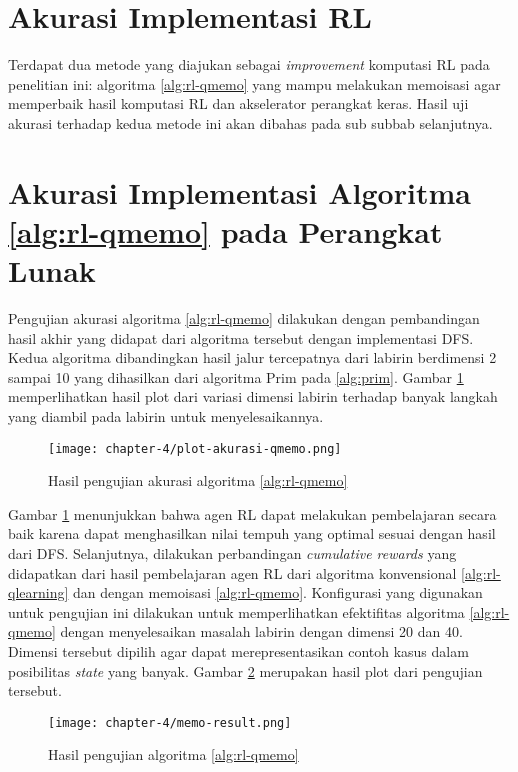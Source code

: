 \section{Akurasi Implementasi \acl{RL}}

Terdapat dua metode yang diajukan sebagai \textit{improvement} komputasi \ac{RL} pada penelitian ini: algoritma \ref{alg:rl-qmemo} yang mampu melakukan memoisasi agar memperbaik hasil komputasi \ac{RL} dan akselerator perangkat keras. Hasil uji akurasi terhadap kedua metode ini akan dibahas pada sub subbab selanjutnya.


\section{Akurasi Implementasi Algoritma \ref{alg:rl-qmemo} pada Perangkat Lunak}

Pengujian akurasi algoritma \ref{alg:rl-qmemo} dilakukan dengan pembandingan hasil akhir yang didapat dari algoritma tersebut dengan implementasi \ac{DFS}. Kedua algoritma dibandingkan hasil jalur tercepatnya dari labirin berdimensi 2 sampai 10 yang dihasilkan dari algoritma Prim pada \ref{alg:prim}. Gambar \ref{fig:akurasi-qmemo} memperlihatkan hasil plot dari variasi dimensi labirin terhadap banyak langkah yang diambil pada labirin untuk menyelesaikannya.

\begin{figure}[h]
	\centering
	\texttt{[image: chapter-4/plot-akurasi-qmemo.png]}
	\caption{Hasil pengujian akurasi algoritma \ref{alg:rl-qmemo}}
	\label{fig:akurasi-qmemo}
\end{figure}

Gambar \ref{fig:akurasi-qmemo} menunjukkan bahwa agen \ac{RL} dapat melakukan pembelajaran secara baik karena dapat menghasilkan nilai tempuh yang optimal sesuai dengan hasil dari \ac{DFS}. Selanjutnya, dilakukan perbandingan \textit{cumulative rewards} yang didapatkan dari hasil pembelajaran agen \ac{RL} dari algoritma konvensional \ref{alg:rl-qlearning} dan dengan memoisasi \ref{alg:rl-qmemo}. Konfigurasi yang digunakan untuk pengujian ini dilakukan untuk memperlihatkan efektifitas algoritma \ref{alg:rl-qmemo} dengan menyelesaikan masalah labirin dengan dimensi 20 dan 40. Dimensi tersebut dipilih agar dapat merepresentasikan contoh kasus dalam posibilitas \textit{state} yang banyak. Gambar \ref{fig:memo-result} merupakan hasil plot dari pengujian tersebut.

\begin{figure}[h]
	\centering
	\texttt{[image: chapter-4/memo-result.png]}
	\caption{Hasil pengujian algoritma \ref{alg:rl-qmemo}}
	\label{fig:memo-result}
\end{figure}

